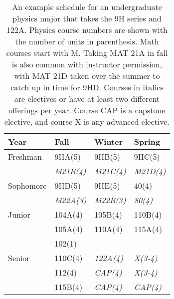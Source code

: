 \documentclass[12pt]{article}
\begin{document}
\begin{table}
\caption{An example schedule for an undergraduate physics major that
  takes the 9H series and 122A. Physics course numbers are shown with
  the number of units in parenthesis.  Math courses start with M.
  Taking MAT 21A in fall is also common with instructor permission,
  with MAT 21D taken over the summer to catch up in time for 9HD.
  Courses in italics are electives or have at least two different
  offerings per year. Course CAP is a capstone elective, and course X
  is any advanced elective.}

\label{tbl:current-honors}
\begin{center}
\begin{tabular}{|l|l|l|l|}
\hline
Year      & Fall    & Winter & Spring \\
\hline
Freshman  & 9HA(5)     & 9HB(5)     & 9HC(5) \\
          & {\it M21B(4)}  & {\it M21C(4)}  & {\it M21D(4)} \\
\hline
Sophomore & 9HD(5)     & 9HE(5)     & 40(4)     \\
          & {\it M22A(3)}     & {\it M22B(3)} & {\it 80(4)} \\
\hline
Junior    & 104A(4) & 105B(4) & 110B(4)\\
          & 105A(4) & 110A(4) & 115A(4)\\
          & 102(1)  &    &     \\
\hline
Senior    & 110C(4) & {\it 122A(4)} & {\it X(3-4)}\\
          & 112(4)  & {\it CAP(4)}   & {\it X(3-4)}\\
          & 115B(4) & {\it CAP(4)}   & {\it CAP(4)}\\

\hline 
\end{tabular}
\end{center}
\end{table}
\end{document}
